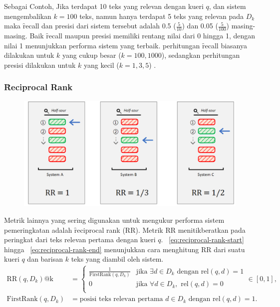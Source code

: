         Sebagai Contoh, Jika terdapat 10 teks yang relevan dengan kueri $q$, dan sistem mengembalikan $k=100$ teks, namun hanya terdapat 5 teks yang relevan pada $D_k$  maka \f{recall} dan presisi dari sistem tersebut adalah 0.5 ($\frac{5}{10}$) dan 0.05 ($\frac{5}{100}$) masing-masing. Baik \f{recall} maupun presisi memiliki rentang nilai dari 0 hingga 1, dengan nilai 1 menunjukkan performa sistem yang terbaik. perhitungan \f{recall} biasanya dilakukan untuk $k$ yang cukup besar ($k = 100,1000 $), sedangkan perhitungan presisi dilakukan untuk $k$ yang kecil ($k = 1, 3, 5$) \citep{irlecture}.


        \subsubsection{\f{Reciprocal Rank}}

        \begin{figure}
            \centering
            \includegraphics[width=1\textwidth]{assets/pics/rr.png}
            \label{fig:reciprocal-rank}
        \end{figure}
        Metrik lainnya yang sering digunakan untuk mengukur performa sistem pemeringkatan adalah \f{reciprocal rank} (RR). Metrik RR menitikberatkan pada peringkat dari teks relevan pertama dengan kueri $q$. \equ~\ref{eq:reciprocal-rank-start} hingga \equ~\ref{eq:reciprocal-rank-end} menunjukkan cara menghitung RR dari suatu kueri $q$ dan barisan $k$ teks yang diambil oleh sistem.
        \begin{align}
            \text{RR}(q, D_k)\text{@k} &= \begin{cases}
                \label{eq:reciprocal-rank-start}
                \frac{1}{\text{FirstRank}(q, D_k)} & \text{jika } \exists d \in D_k \text{ dengan } \text{rel}(q, d) = 1 \\        
                0 & \text{jika } \forall d \in D_k, \text{ rel}(q, d) = 0 \\
                \end{cases} \in [0, 1], \\
                \label{eq:reciprocal-rank-end}
                \text{FirstRank}(q,D_k) &= \text{posisi teks relevan pertama } d\in D_k \text{ dengan } \text{rel}(q, d) = 1.
        \end{align}

